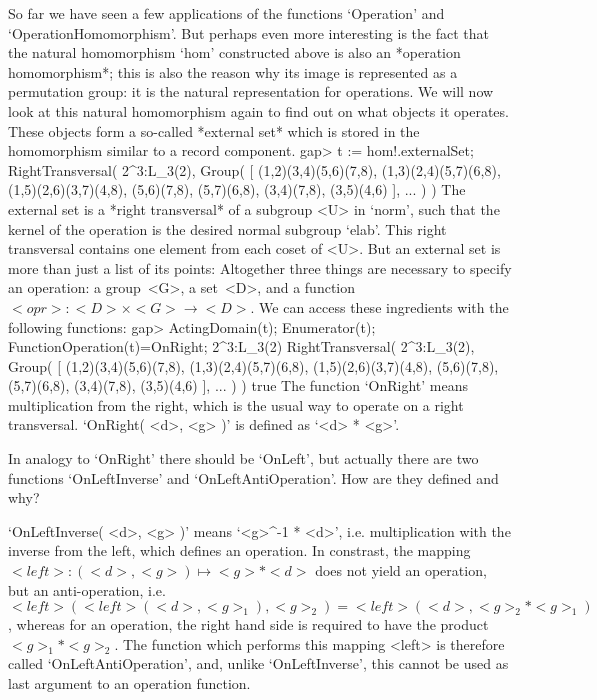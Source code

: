 So far we have  seen a few  applications of the functions `Operation' and
`OperationHomomorphism'.  But perhaps even more   interesting is the fact
that   the  natural homomorphism `hom'    constructed  above is  also  an
*operation homomorphism*;
%
this is also  the reason  why its  image is represented  as a permutation
group: it is the natural representation  for operations. We will now look
at this  natural   homomorphism again to   find  out on what objects   it
operates. These objects form  a so-called *external  set* which is stored
in the homomorphism similar to a record component.
\beginexample
    gap> t := hom!.externalSet;
    RightTransversal( 2^3:L_3(2), Group( 
    [ (1,2)(3,4)(5,6)(7,8), (1,3)(2,4)(5,7)(6,8), (1,5)(2,6)(3,7)(4,8), 
      (5,6)(7,8), (5,7)(6,8), (3,4)(7,8), (3,5)(4,6) ], ... ) )
\endexample
The external  set is a *right  transversal* of a  subgroup <U> in `norm',
such  that  the kernel of the   operation is the desired  normal subgroup
`elab'.  This right transversal contains  one  element from each coset of
<U>. But   an external  set   is more than just  a   list of its  points:
Altogether  three things are  necessary    to  specify an  operation:   a
group~<G>, a set~<D>, and a  function $<opr>\colon <D>\times <G>\to <D>$.
We can access these ingredients with the following functions:
\beginexample
    gap> ActingDomain(t); Enumerator(t); FunctionOperation(t)=OnRight;
    2^3:L_3(2)
    RightTransversal( 2^3:L_3(2), Group( 
    [ (1,2)(3,4)(5,6)(7,8), (1,3)(2,4)(5,7)(6,8), (1,5)(2,6)(3,7)(4,8), 
      (5,6)(7,8), (5,7)(6,8), (3,4)(7,8), (3,5)(4,6) ], ... ) )
    true
\endexample
The function `OnRight' means multiplication from the  right, which is the
usual way to  operate on a right transversal.  `OnRight(  <d>, <g> )'  is
defined as `<d> * <g>'.

\exercise In analogy to `OnRight' there should  be `OnLeft', but actually
there  are two  functions `OnLeftInverse'  and `OnLeftAntiOperation'. How
are they defined and why?

\answer   `OnLeftInverse( <d>,  <g>    )'  means `<g>^-1   *  <d>',  i.e.
multiplication with the   inverse  from   the  left, which   defines   an
operation. In constrast, the mapping  $<left>\colon (<d>,<g>) \mapsto <g>
* <d>$ does not yield an  operation, but an anti-operation, i.e. $<left>(
<left>( <d>,  <g>_1 ), <g>_2  ) = <left>( <d>, <g>_2  * <g>_1 )$, whereas
for  an operation, the right hand  side is  required  to have the product
$<g>_1 * <g>_2$. The {\GAP}  function which performs this mapping  <left>
is  therefore called  `OnLeftAntiOperation', and, unlike `OnLeftInverse',
this cannot be used as last argument to an operation function.


